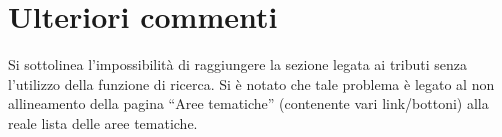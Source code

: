 \section{Ulteriori commenti}

Si sottolinea l'impossibilità di raggiungere la sezione legata ai tributi senza 
l'utilizzo della funzione di ricerca. Si è notato che tale problema è legato al 
non allineamento della pagina ``Aree tematiche'' (contenente vari link/bottoni) 
alla reale lista delle aree tematiche.
